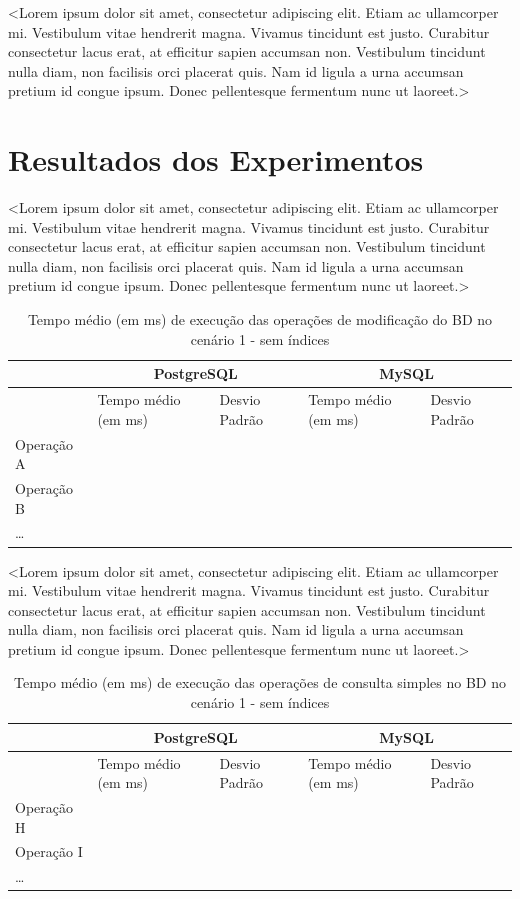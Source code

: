 \documentclass[12pt,a4paper]{article}
\begin{document}
<Lorem ipsum dolor sit amet, consectetur adipiscing elit. Etiam ac ullamcorper mi. Vestibulum vitae hendrerit magna. Vivamus tincidunt est justo. Curabitur consectetur lacus erat, at efficitur sapien accumsan non. Vestibulum tincidunt nulla diam, non facilisis orci placerat quis. Nam id ligula a urna accumsan pretium id congue ipsum. Donec pellentesque fermentum nunc ut laoreet.>

\section{Resultados dos Experimentos}

<Lorem ipsum dolor sit amet, consectetur adipiscing elit. Etiam ac ullamcorper mi. Vestibulum vitae hendrerit magna. Vivamus tincidunt est justo. Curabitur consectetur lacus erat, at efficitur sapien accumsan non. Vestibulum tincidunt nulla diam, non facilisis orci placerat quis. Nam id ligula a urna accumsan pretium id congue ipsum. Donec pellentesque fermentum nunc ut laoreet.>

\begin{table}[ht]
\centering
\begin{tabular}{|l|l|l|l|l|}
\hline
 & \multicolumn{2}{c|}{PostgreSQL} & \multicolumn{2}{c|}{MySQL} \\
\hline
 & Tempo médio (em ms) & Desvio Padrão & Tempo médio (em ms) & Desvio Padrão \\
\hline
Operação A & & & & \\
\hline
Operação B & & & & \\
\hline
\dots & & & & \\
\hline
\end{tabular}
\caption{Tempo médio (em ms) de execução das operações de modificação do BD no cenário 1 - sem índices}
\end{table}

<Lorem ipsum dolor sit amet, consectetur adipiscing elit. Etiam ac ullamcorper mi. Vestibulum vitae hendrerit magna. Vivamus tincidunt est justo. Curabitur consectetur lacus erat, at efficitur sapien accumsan non. Vestibulum tincidunt nulla diam, non facilisis orci placerat quis. Nam id ligula a urna accumsan pretium id congue ipsum. Donec pellentesque fermentum nunc ut laoreet.>

\begin{table}[ht]
\centering
\begin{tabular}{|l|l|l|l|l|}
\hline
 & \multicolumn{2}{c|}{PostgreSQL} & \multicolumn{2}{c|}{MySQL} \\
\hline
 & Tempo médio (em ms) & Desvio Padrão & Tempo médio (em ms) & Desvio Padrão \\
\hline
Operação H & & & & \\
\hline
Operação I & & & & \\
\hline
\dots & & & & \\
\hline
\end{tabular}
\caption{Tempo médio (em ms) de execução das operações de consulta simples no BD no cenário 1 - sem índices}
\end{table}
\end{document}
